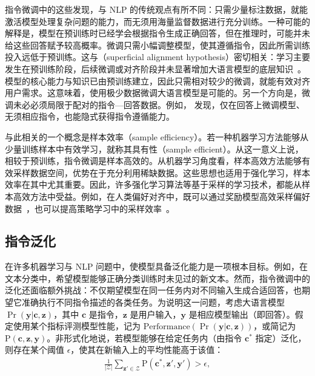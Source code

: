 指令微调中的这些发现，与 NLP 的传统观点有所不同：只需少量标注数据，就能激活模型处理复杂问题的能力，而无须用海量监督数据进行充分训练。一种可能的解释是，模型在预训练时已经学会根据指令生成正确回答，但在推理时，可能并未给这些回答赋予较高概率。微调只需小幅调整模型，使其遵循指令，因此所需训练投入远低于预训练。这与（superficial alignment hypothesis）密切相关：学习主要发生在预训练阶段，后续微调或对齐阶段并未显著增加大语言模型的底层知识~\cite{zhou-etal:2023lima}。模型的核心能力与知识已由预训练建立，因此只需相对较少的微调，就能有效对齐用户需求。这意味着，使用极少数据微调大语言模型是可能的。另一个方向是，微调未必必须局限于配对的指令—回答数据。例如，\citet{hewitt-etal:2024instruction} 发现，仅在回答上微调模型、无须相应指令，也能隐式获得指令遵循能力。

与此相关的一个概念是样本效率（sample efficiency）。若一种机器学习方法能够从少量训练样本中有效学习，就称其具有性（sample efficient）。从这一意义上说，相较于预训练，指令微调是样本高效的。从机器学习角度看，样本高效方法能够有效采样数据空间，优势在于充分利用稀缺数据。这些思想也适用于强化学习，样本效率在其中尤其重要。因此，许多强化学习算法等基于采样的学习技术，都能从样本高效方法中受益。例如，在人类偏好对齐中，既可以通过奖励模型高效采样偏好数据~\cite{liu-etal:2024statistical}，也可以提高策略学习中的采样效率~\cite{wang-etal:2024esrl}。

\subsection{指令泛化}
\label{sec:instruction-generalization}

在许多机器学习与 NLP 问题中，使模型具备泛化能力是一项根本目标。例如，在文本分类中，希望模型能够正确分类训练时未见过的新文本。然而，指令微调中的泛化还面临额外挑战：不仅期望模型在同一任务内对不同输入生成合适回答，也期望它准确执行不同指令描述的各类任务。为说明这一问题，考虑大语言模型 $\Pr(\mathbf{y}|\mathbf{c},\mathbf{z})$，其中 $\mathbf{c}$ 是指令，$\mathbf{z}$ 是用户输入，$\mathbf{y}$ 是相应模型输出（即回答）。假定使用某个指标评测模型性能，记为 $\mathrm{Performance}(\Pr(\mathbf{y}|\mathbf{c},\mathbf{z}))$，或简记为 $\mathrm{P}(\mathbf{c},\mathbf{z},\mathbf{y})$。非形式化地说，若模型能够在给定任务内（由指令 $\mathbf{c}^*$ 指定）泛化，则存在某个阈值 $\epsilon$，使其在新输入上的平均性能高于该值：
\begin{eqnarray}
\frac{1}{|\mathcal{Z}|} \sum_{\mathbf{z}'\in \mathcal{Z}} \mathrm{P}(\mathbf{c}^*,\mathbf{z}',\mathbf{y}') > \epsilon,
\end{eqnarray}

